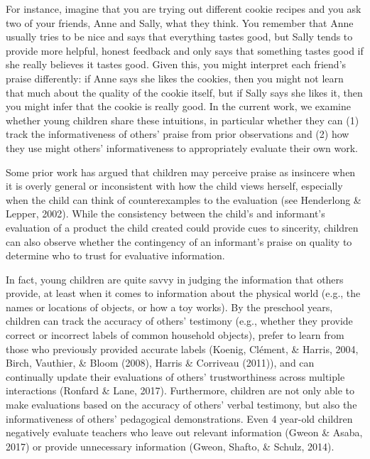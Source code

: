 \documentclass[10pt, letterpaper]{article}
\begin{document}
For instance, imagine that you are trying out different cookie recipes
and you ask two of your friends, Anne and Sally, what they think. You
remember that Anne usually tries to be nice and says that everything
tastes good, but Sally tends to provide more helpful, honest feedback
and only says that something tastes good if she really believes it
tastes good. Given this, you might interpret each friend's praise
differently: if Anne says she likes the cookies, then you might not
learn that much about the quality of the cookie itself, but if Sally
says she likes it, then you might infer that the cookie is really good.
In the current work, we examine whether young children share these
intuitions, in particular whether they can (1) track the informativeness
of others' praise from prior observations and (2) how they use might
others' informativeness to appropriately evaluate their own work.

Some prior work has argued that children may perceive praise as
insincere when it is overly general or inconsistent with how the child
views herself, especially when the child can think of counterexamples to
the evaluation (see Henderlong \& Lepper, 2002). While the consistency
between the child's and informant's evaluation of a product the child
created could provide cues to sincerity, children can also observe
whether the contingency of an informant's praise on quality to determine
who to trust for evaluative information.

In fact, young children are quite savvy in judging the information that
others provide, at least when it comes to information about the physical
world (e.g., the names or locations of objects, or how a toy works). By
the preschool years, children can track the accuracy of others'
testimony (e.g., whether they provide correct or incorrect labels of
common household objects), prefer to learn from those who previously
provided accurate labels (Koenig, Clément, \& Harris, 2004, Birch,
Vauthier, \& Bloom (2008), Harris \& Corriveau (2011)), and can
continually update their evaluations of others' trustworthiness across
multiple interactions (Ronfard \& Lane, 2017). Furthermore, children are
not only able to make evaluations based on the accuracy of others'
verbal testimony, but also the informativeness of others' pedagogical
demonstrations. Even 4 year-old children negatively evaluate teachers
who leave out relevant information (Gweon \& Asaba, 2017) or provide
unnecessary information (Gweon, Shafto, \& Schulz, 2014).
\end{document}
